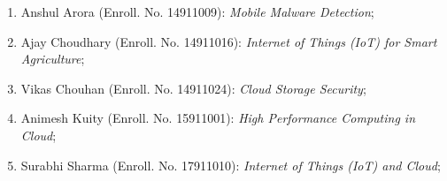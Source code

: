 	\begin{enumerate}[label=(PHD\arabic*).]	
			\item Anshul Arora (Enroll. No. 14911009): \textit{Mobile Malware Detection};
			\item Ajay Choudhary (Enroll. No. 14911016): \textit{Internet of Things (IoT) for Smart Agriculture};
			\item Vikas Chouhan (Enroll. No. 14911024): \textit{Cloud Storage Security};
			\item Animesh Kuity (Enroll. No. 15911001): \textit{High Performance Computing in Cloud};			
			\item Surabhi Sharma (Enroll. No. 17911010): \textit{Internet of Things (IoT) and Cloud};		 
	\end{enumerate}